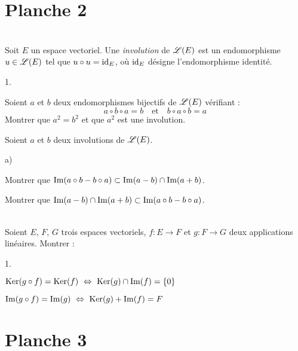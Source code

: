 \documentclass[11pt]{article}%
\begin{document}
\newpage


\section*{Planche 2}

\begin{exercice}~\\ %
Soit $E$ un espace vectoriel. Une {\it involution} de $\mathscr{L}(E)$ est un 
endomorphisme $u \in \mathscr{L}(E)$ tel que $u \circ u = {\rm{id}}_E$, où ${\rm{id}}_E$ 
désigne l'endomorphisme identité.
\begin{noliste}{1.}
  \item Soient $a$ et $b$ deux endomorphismes bijectifs de $\mathscr{L}(E)$ 
  vérifiant :
  \[
    a \circ b \circ a =b \quad \text{et} \quad b \circ a \circ b = a
  \]
  Montrer que $a^2=b^2$ et que $a^2$ est une involution.
  
  \item Soient $a$ et $b$ deux involutions de $\mathscr{L}(E)$.
  \begin{noliste}{a)}
    \item Montrer que $\operatorname{Im}(a \circ b - b\circ a) \subset \operatorname{Im}(a-b) 
    \cap \operatorname{Im}(a+b)$.

    \item Montrer que $\operatorname{Im}(a-b) \cap \operatorname{Im}(a+b) \subset \operatorname{Im}(a \circ b - b 
    \circ a)$.
  \end{noliste}
\end{noliste}
\end{exercice}

\begin{exercice}~\\ %
  Soient $E$, $F$, $G$ trois espaces vectoriels, $f:E \to F$ et $g:F 
  \to G$ deux applications linéaires. Montrer  :
\begin{noliste}{1.}
  \item $\operatorname{Ker}(g \circ f) = \operatorname{Ker}(f) \ \Leftrightarrow \ \operatorname{Ker}(g) \cap \operatorname{Im}(f) 
  = \{0\}$
  
  \item $\operatorname{Im}(g \circ f) = \operatorname{Im}(g) \ \Leftrightarrow \ \operatorname{Ker}(g) + \operatorname{Im}(f) 
  = F$
\end{noliste}
\end{exercice}



\newpage


\section*{Planche 3}
\end{document}
